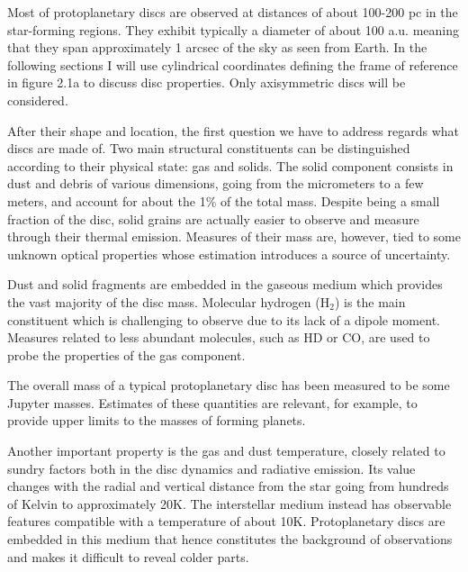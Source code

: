 \documentclass[a4paper,10pt]{report}
\begin{document}

Most of protoplanetary discs are observed at distances of about 100-200 pc in the star-forming regions. 
They exhibit typically a diameter of about 100 a.u. meaning that they span approximately
1 arcsec of the sky as seen from Earth.
In the following sections I will use cylindrical coordinates 
defining the frame of reference in figure 2.1a to discuss disc properties. Only axisymmetric discs will be considered.

After their shape and location, the first question we have to address regards what discs are made of.
Two main structural constituents can be distinguished according to their physical state: gas and solids.
The solid component consists in dust and debris of various dimensions, going from the micrometers to a few 
meters, and account for about the 1\% of the total mass. Despite being a small fraction of the disc, solid grains
are actually easier to observe and measure through their thermal emission. Measures of their mass are, however, tied to
some unknown optical properties whose estimation introduces a source of uncertainty.

Dust and solid fragments are embedded in the gaseous medium which provides the vast majority of the disc mass.
Molecular hydrogen (H$_2$) is the main constituent which is challenging to observe due to
its lack of a dipole moment. 
Measures related to less abundant molecules, such as HD or CO, are used to probe the properties of the gas component. 

The overall mass of a typical protoplanetary disc has been measured to be some Jupyter masses.
Estimates of these quantities are relevant, for example, to provide upper limits
to the masses of forming planets.

Another important property is the gas and dust temperature, closely related to sundry factors both in the disc dynamics and radiative emission.
Its value changes with the radial and vertical distance from the star going from hundreds of Kelvin to approximately 20K.
The interstellar medium instead has observable features compatible with a temperature of about 10K. Protoplanetary discs are embedded in this medium 
that hence constitutes the background of observations and makes it difficult to reveal colder parts.
\end{document}
